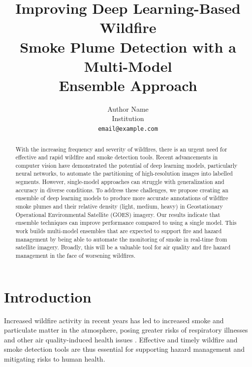 \documentclass{article}
\title{Improving Deep Learning-Based Wildfire\\ Smoke Plume Detection with a Multi-Model\\ Ensemble Approach}
\author{Author Name \\
Institution \\
\texttt{email@example.com}
}
\begin{document}
\maketitle
\begin{abstract}
    With the increasing frequency and severity of wildfires, there is an urgent need for effective and rapid wildfire and smoke detection tools. Recent advancements in computer vision have demonstrated the potential of deep learning models, particularly neural networks, to automate the partitioning of high-resolution images into labelled segments. However, single-model approaches can struggle with generalization and accuracy in diverse conditions. To address these challenges, we propose creating  an ensemble of deep learning models to produce more accurate annotations of wildfire smoke plumes and their relative density (light, medium, heavy) in Geostationary Operational Environmental Satellite (GOES) imagery. Our results indicate that ensemble techniques can improve performance compared to using a single model. This work builds multi-model ensembles that are expected to support fire and hazard management by being able to automate the monitoring of smoke in real-time from satellite imagery. Broadly, this will be a valuable tool for air quality and fire hazard management in the face of worsening wildfires.
\end{abstract}

\section{Introduction}
Increased wildfire activity in recent years has led to increased  smoke and particulate matter in the atmosphere, posing greater risks of respiratory illnesses and other air quality-induced health issues \citep{wildfire-risk}. Effective and timely wildfire and smoke detection tools are thus essential for supporting hazard management and mitigating risks to human health. 
\end{document}

